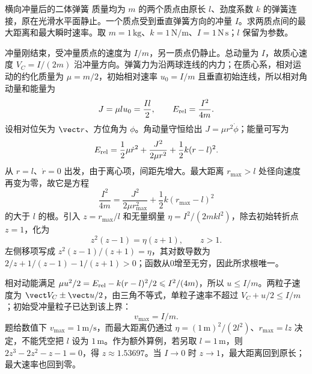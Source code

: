 \begin{practicebox}{横向冲量后的二体弹簧}
质量均为 $m$ 的两个质点由原长 $l$、劲度系数 $k$ 的弹簧连接，原在光滑水平面静止。一个质点受到垂直弹簧方向的冲量 $I$。求两质点间的最大距离和最大瞬时速率。取 $m=1\,\mathrm{kg}$、$k=1\,\mathrm{N/m}$、$I=1\,\mathrm{N\,s}$；$l$ 保留为参数。
\label{r2ch02:pr:010}
\begin{solution}
冲量刚结束，受冲量质点的速度为 $I/m$，另一质点仍静止。总动量为 $I$，故质心速度 $V_C=I/(2m)$ 沿冲量方向。弹簧力为沿两球连线的内力；在质心系，相对运动的约化质量为 $\mu=m/2$，初始相对速率 $u_0=I/m$ 且垂直初始连线，所以相对角动量和能量为
\[
 J=\mu lu_0=\frac{Il}{2},\qquad E_{\rm rel}=\frac{I^2}{4m}.
\]
设相对位矢为 $\vect r$、方位角为 $\phi$。角动量守恒给出 $J=\mu r^2\dot\phi$；能量可写为
\[
 E_{\rm rel}=\frac12\mu\dot r^2+\frac{J^2}{2\mu r^2}
             +\frac12k(r-l)^2.
\]
从 $r=l$、$\dot r=0$ 出发，由于离心项，间距先增大。最大距离 $r_{\max}>l$ 处径向速度再变为零，故它是方程
\[
 \boxed{\frac{I^2}{4m}=\frac{J^2}{2\mu r_{\max}^2}
 +\frac12k(r_{\max}-l)^2}
\]
的大于 $l$ 的根。引入 $z=r_{\max}/l$ 和无量纲量 $\eta=I^2/(2mkl^2)$，除去初始转折点 $z=1$，化为
\[
 \boxed{z^2(z-1)=\eta(z+1),\qquad z>1}.
\]
左侧移项写成 $z^2(z-1)/(z+1)=\eta$，其对数导数为
$2/z+1/(z-1)-1/(z+1)>0$；函数从0增至无穷，因此所求根唯一。

相对动能满足 $\mu u^2/2=E_{\rm rel}-k(r-l)^2/2\leqslant I^2/(4m)$，所以 $u\leqslant I/m$。两粒子速度为 $\vect V_C\pm\vect u/2$，由三角不等式，单粒子速率不超过 $V_C+u/2\leqslant I/m$；初始受冲量粒子已达到该上界：
\[
 \boxed{v_{\max}=I/m}.
\]
题给数值下 $v_{\max}=1\,\mathrm{m/s}$，而最大距离仍通过
$\eta=(1\,\mathrm m)^2/(2l^2)$、$r_{\max}=lz$ 决定，不能凭空把 $l$ 设为 $1\,\mathrm m$。作为额外算例，若另取 $l=1\,\mathrm m$，则 $2z^3-2z^2-z-1=0$，得 $z\approx1.53697$。当 $I\to0$ 时 $z\to1$，最大距离回到原长；最大速率也回到零。
\end{solution}
\end{practicebox}

